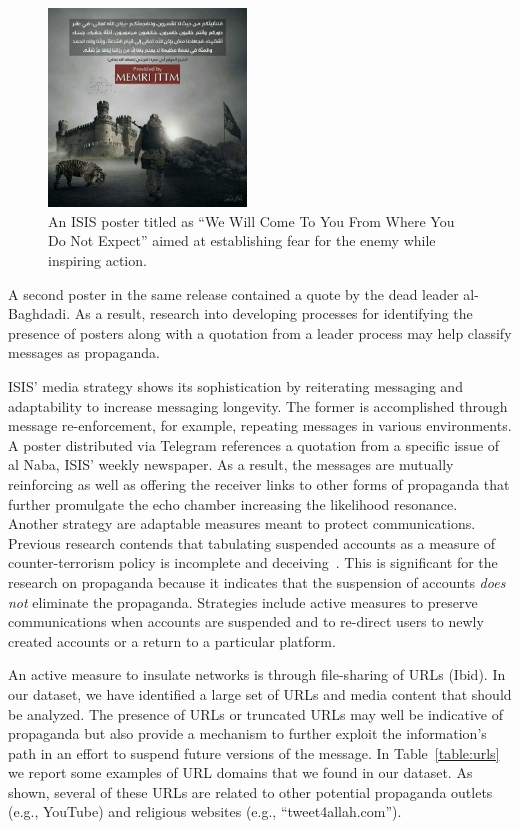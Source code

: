 \documentclass[letterpaper]{article}
\begin{document}
\begin{figure}[ht]
\includegraphics[width=0.47\textwidth]{img/poster2.jpeg}
\caption{An ISIS poster titled as ``We Will Come To You From Where You Do Not Expect'' aimed at establishing fear for the enemy while inspiring action.}
\label{fig:memri-poster}
\end{figure}

A second poster in the same release contained a quote by the dead leader al-Baghdadi. As a result, research into developing processes for identifying the presence of posters along with a quotation from a leader process may help classify messages as propaganda.

ISIS' media strategy shows its sophistication by reiterating messaging and adaptability to increase messaging longevity. The former is accomplished through message re-enforcement, for example, repeating messages in various environments. A poster distributed via Telegram references a quotation from a specific issue of al Naba, ISIS' weekly newspaper. As a result, the messages are mutually reinforcing as well as offering the receiver links to other forms of propaganda that further promulgate the echo chamber increasing the likelihood resonance. Another strategy are adaptable measures meant to protect communications. Previous research contends that tabulating suspended accounts as a  measure of counter-terrorism policy is incomplete and deceiving~\cite{weirman2020hyperlinked}.
This is significant for the research on propaganda because it indicates that the suspension of accounts\textit{ does not} eliminate the propaganda. Strategies include active measures to preserve communications when accounts are suspended and to re-direct users to newly created accounts or a return to a particular platform.

An active measure to insulate networks is through file-sharing of URLs (Ibid). In our  dataset, we have identified a large set of URLs and media content that should be analyzed. The presence of URLs or truncated URLs may well be indicative of propaganda but also provide a mechanism to further exploit the information's path in an effort to suspend future versions of the message.   In Table~\ref{table:urls} we report some examples of URL domains that we found in our dataset. As shown, several of these URLs are related to other potential propaganda outlets (e.g., YouTube) and religious websites (e.g., ``tweet4allah.com'').
\end{document}
